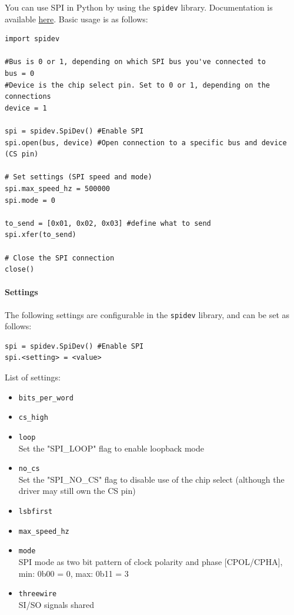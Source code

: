 You can use SPI in Python by using the \verb|spidev| library. Documentation is available \href{https://pypi.org/project/spidev/}{here}. Basic usage is as follows:
\begin{lstlisting}
import spidev

#Bus is 0 or 1, depending on which SPI bus you've connected to
bus = 0
#Device is the chip select pin. Set to 0 or 1, depending on the connections
device = 1

spi = spidev.SpiDev() #Enable SPI
spi.open(bus, device) #Open connection to a specific bus and device (CS pin)

# Set settings (SPI speed and mode)
spi.max_speed_hz = 500000
spi.mode = 0

to_send = [0x01, 0x02, 0x03] #define what to send
spi.xfer(to_send)

# Close the SPI connection
close()
\end{lstlisting}

\paragraph{Settings}
The following settings are configurable in the \verb|spidev| library, and can be set as follows:
\begin{lstlisting}
spi = spidev.SpiDev() #Enable SPI
spi.<setting> = <value>
\end{lstlisting}
List of settings:
\begin{itemize}
    \item \verb|bits_per_word|
    \item \verb|cs_high|
    \item \verb|loop|\\
        Set the "SPI\_LOOP" flag to enable loopback mode
    \item \verb|no_cs|\\
        Set the "SPI\_NO\_CS" flag to disable use of the chip select (although the driver may still own the CS pin)
    \item \verb|lsbfirst|
    \item \verb|max_speed_hz|
    \item \verb|mode|\\
        SPI mode as two bit pattern of clock polarity and phase [CPOL/CPHA], min: 0b00 = 0, max: 0b11 = 3
    \item \verb|threewire|\\
        SI/SO signals shared
\end{itemize}

